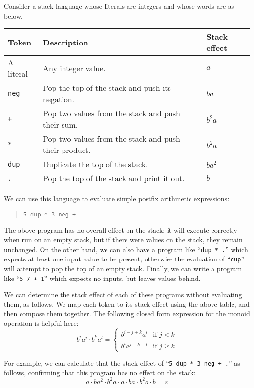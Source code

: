\documentclass[../generics]{subfiles}
\begin{document}
\begin{example}
Consider a stack language whose literals are integers and whose words are as below.
\begin{center}
\begin{tabular}{lll}
\toprule
\textbf{Token}&\textbf{Description}&\textbf{Stack effect}\\
\midrule
A literal&Any integer value.&$a$\\
\texttt{neg}&Pop the top of the stack and push its negation.&$ba$\\
\texttt{+}&Pop two values from the stack and push their sum.&$b^2a$\\
\texttt{*}&Pop two values from the stack and push their product.&$b^2a$\\
\texttt{dup}&Duplicate the top of the stack.&$ba^2$\\
\texttt{.}&Pop the top of the stack and print it out.&$b$\\
\bottomrule
\end{tabular}
\end{center}

We can use this language to evaluate simple postfix arithmetic expressions:
\begin{quote}
\begin{verbatim}
5 dup * 3 neg + .
\end{verbatim}
\end{quote}
The above program has no overall effect on the stack; it will execute correctly when run on an empty stack, but if there were values on the stack, they remain unchanged. On the other hand, we can also have a program like ``\verb|dup * .|'' which expects at least one input value to be present, otherwise the evaluation of ``\texttt{dup}'' will attempt to pop the top of an empty stack. Finally, we can write a program like ``\verb|5 7 + 1|'' which expects no inputs, but leaves values behind.

We can determine the stack effect of each of these programs without evaluating them, as follows. We map each token to its stack effect using the above table, and then compose them together. The following closed form expression for the monoid operation is helpful here:
\[
b^i a^j \cdot b^k a^l = \begin{cases}
b^{i-j+k} a^l &\text{if $j<k$}\\
b^i a^{j-k+l} &\text{if $j\geq k$}
\end{cases}
\]

For example, we can calculate that the stack effect of ``\verb|5 dup * 3 neg + .|'' as follows, confirming that this program has no effect on the stack:
\[a\cdot ba^2 \cdot b^2a \cdot a \cdot ba \cdot b^2a \cdot b = \varepsilon\]


\end{example}
\end{document}
